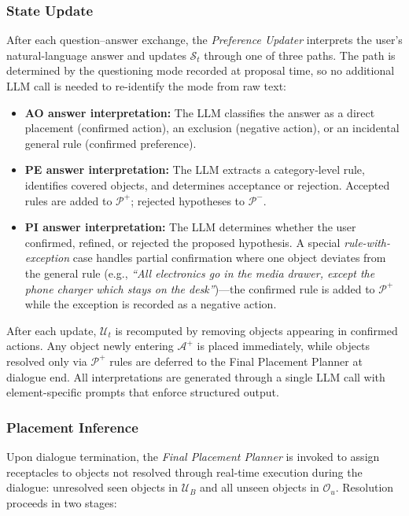 \documentclass[manuscript,review,anonymous]{acmart}
\begin{document}
{\subsubsection{State Update}
\label{sec:state-update}

After each question--answer exchange, the \textit{Preference Updater} interprets the user's natural-language answer and updates $\mathcal{S}_t$ through one of three paths. The path is determined by the questioning mode recorded at proposal time, so no additional LLM call is needed to re-identify the mode from raw text:

\begin{itemize}[leftmargin=*]
    \item \textbf{AO answer interpretation:} The LLM classifies the answer as a direct placement (confirmed action), an exclusion (negative action), or an incidental general rule (confirmed preference).
    \item \textbf{PE answer interpretation:} The LLM extracts a category-level rule, identifies covered objects, and determines acceptance or rejection. Accepted rules are added to $\mathcal{P}^+$; rejected hypotheses to $\mathcal{P}^-$.
    \item \textbf{PI answer interpretation:} The LLM determines whether the user confirmed, refined, or rejected the proposed hypothesis. A special \textit{rule-with-exception} case handles partial confirmation where one object deviates from the general rule (e.g., \textit{``All electronics go in the media drawer, except the phone charger which stays on the desk''})---the confirmed rule is added to $\mathcal{P}^+$ while the exception is recorded as a negative action.
\end{itemize}

After each update, $\mathcal{U}_t$ is recomputed by removing objects appearing in confirmed actions. Any object newly entering $\mathcal{A}^+$ is placed immediately, while objects resolved only via $\mathcal{P}^+$ rules are deferred to the Final Placement Planner at dialogue end. All interpretations are generated through a single LLM call with element-specific prompts that enforce structured output.

\subsubsection{Placement Inference}
\label{sec:final-planner}

Upon dialogue termination, the \textit{Final Placement Planner} is invoked to assign receptacles to objects not resolved through real-time execution during the dialogue: unresolved seen objects in $\mathcal{U}_B$ and all unseen objects in $\mathcal{O}_u$. Resolution proceeds in two stages:

}
\end{document}
